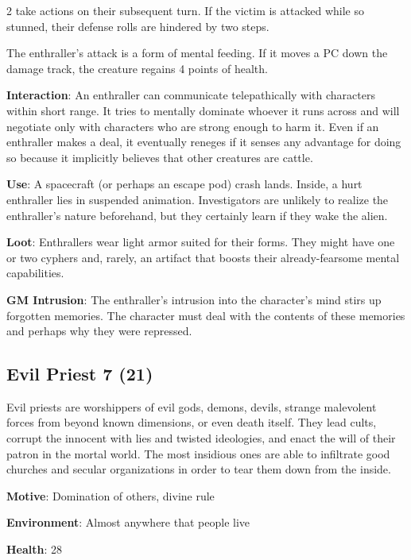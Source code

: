 \begin{multicols}{2}
take actions on their subsequent turn. If the victim is attacked while so stunned, their defense rolls are hindered by two steps.

The enthraller’s attack is a form of mental feeding. If it moves a PC down the damage track, the creature regains 4 points of health.

\textbf{Interaction}: An enthraller can communicate telepathically with characters within short range. It tries to mentally dominate whoever it runs across and will negotiate only with characters who are strong enough to harm it. Even if an enthraller makes a deal, it eventually reneges if it senses any advantage for doing so because it implicitly believes that other creatures are cattle.

\textbf{Use}: A spacecraft (or perhaps an escape pod) crash lands. Inside, a hurt enthraller lies in suspended animation. Investigators are unlikely to realize the enthraller’s nature beforehand, but they certainly learn if they wake the alien.

\textbf{Loot}: Enthrallers wear light armor suited for their forms. They might have one or two cyphers and, rarely, an artifact that boosts their already-fearsome mental capabilities.

\textbf{GM Intrusion}: The enthraller’s intrusion into the character’s mind stirs up forgotten memories. The character must deal with the contents of these memories and perhaps why they were repressed.

\subsection{Evil Priest 7 (21)}

Evil priests are worshippers of evil gods, demons, devils, strange malevolent forces from beyond known dimensions, or even death itself. They lead cults, corrupt the innocent with lies and twisted ideologies, and enact the will of their patron in the mortal world. The most insidious ones are able to infiltrate good churches and secular organizations in order to tear them down from the inside. 

\textbf{Motive}: Domination of others, divine rule 

\textbf{Environment}: Almost anywhere that people live 

\textbf{Health}: 28 


\end{multicols}

